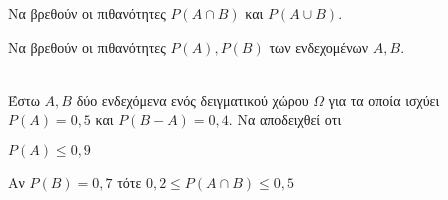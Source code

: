 \documentclass[internet]{diag-xelatex}
\begin{document}
\begin{thema}
\begin{rlist}
\item Να βρεθούν οι πιθανότητες $ P(A\cap B) $ και $ P(A\cup B) $.
\item Να βρεθούν οι πιθανότητες $ P(A), P(B) $ των ενδεχομένων $ A,B $.
\end{rlist}
\item \mbox{}\\
Έστω $ A,B $ δύο ενδεχόμενα ενός δειγματικού χώρου $ \varOmega $ για τα οποία ισχύει $ P(A)=0{,}5 $ και $ P(B-A)=0{,}4 $. Να αποδειχθεί οτι
\begin{rlist}
\item $ P(A)\leq 0{,}9 $
\item Αν $ P(B)=0{,}7 $ τότε $ 0{,}2\leq P(A\cap B)\leq 0{,}5 $
\end{rlist}
\end{thema}
\end{document}
